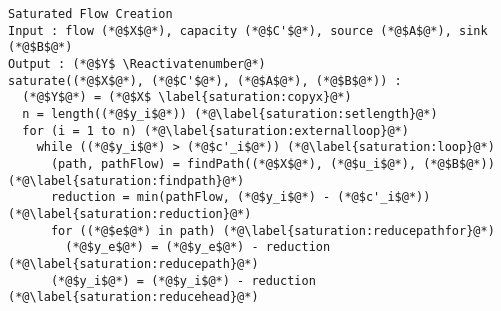 {}
\Suppressnumber
\begin{lstlisting}[label=saturationcode, style=numbers]
Saturated Flow Creation
Input : flow (*@$X$@*), capacity (*@$C'$@*), source (*@$A$@*), sink (*@$B$@*)
Output : (*@$Y$ \Reactivatenumber@*)
saturate((*@$X$@*), (*@$C'$@*), (*@$A$@*), (*@$B$@*)) :
  (*@$Y$@*) = (*@$X$ \label{saturation:copyx}@*)
  n = length((*@$y_i$@*)) (*@\label{saturation:setlength}@*)
  for (i = 1 to n) (*@\label{saturation:externalloop}@*)
    while ((*@$y_i$@*) > (*@$c'_i$@*)) (*@\label{saturation:loop}@*)
      (path, pathFlow) = findPath((*@$X$@*), (*@$u_i$@*), (*@$B$@*)) (*@\label{saturation:findpath}@*)
      reduction = min(pathFlow, (*@$y_i$@*) - (*@$c'_i$@*)) (*@\label{saturation:reduction}@*)
      for ((*@$e$@*) in path) (*@\label{saturation:reducepathfor}@*)
        (*@$y_e$@*) = (*@$y_e$@*) - reduction (*@\label{saturation:reducepath}@*)
      (*@$y_i$@*) = (*@$y_i$@*) - reduction (*@\label{saturation:reducehead}@*)
\end{lstlisting}
